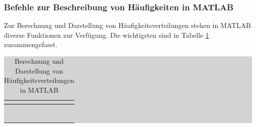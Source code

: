 \clearpage

\subsubsection{Befehle zur Beschreibung von H\"{a}ufigkeiten in MATLAB}

\noindent Zur Berechnung und Darstellung von H\"{a}ufigkeitsverteilungen stehen in MATLAB diverse Funktionen zur Verf\"{u}gung. Die wichtigsten sind in Tabelle \ref{tab:threefive} zusammengefasst.

\begin{table}[H]
\setlength{\arrayrulewidth}{.1em}
\caption{Berechnung und Darstellung von H\"{a}ufigkeitsverteilungen in MATLAB}
\setlength{\fboxsep}{0pt}%
\colorbox{lightgray}{%
%
\begin{tabular}{| c | c |}
\hline
\parbox[c][0.3in][c]{3.3in}{\smallskip\centering\textbf{\selectfont{MATLAB Befehl}}} & 
\parbox[c][0.3in][c]{3.3in}{\smallskip\centering\textbf{\selectfont{Funktionsbeschreibung}}}\\ \hline

\parbox[c][0.3in][c]{3.3in}{\centering{}\selectfont{sort(x)}} & 
\parbox[c][0.3in][c]{3.3in}{\centering{}}\\ \hline

\parbox[c][0.3in][c]{3.3in}{\centering{}\selectfont{cumsum(x)}} & 
\parbox[c][0.3in][c]{3.3in}{\centering{}\selectfont{Berechnet die kumulative Summe des Vektors x}}\\ \hline

\parbox[c][0.5in][c]{3.3in}{\centering{}\selectfont{hist(x)}} & 
\parbox[c][0.5in][c]{3.3in}{\centering{}}\\ \hline

\parbox[c][0.3in][c]{3.3in}{\centering{}\selectfont{tabulate(x)}} & 
\parbox[c][0.3in][c]{3.3in}{\centering{}}\\ \hline

\parbox[c][0.5in][c]{3.3in}{\centering{}\selectfont{bar(x)}} & 
\parbox[c][0.5in][c]{3.3in}{\centering{}\selectfont{Erzeugt ein Balkendiagramm ausx mit vertikaler Ausrichtung}}\\ \hline

\parbox[c][0.5in][c]{3.3in}{\centering{}\selectfont{barh(x)}} & 
\parbox[c][0.5in][c]{3.3in}{\centering{}\selectfont{Erzeugt ein Balkendiagramm ausX mit horizontaler Ausrichtung}}\\ \hline

\parbox[c][0.3in][c]{3.3in}{\centering{}\selectfont{pie(x)}} & 
\parbox[c][0.3in][c]{3.3in}{\centering{}\selectfont{Erzeugt ein Kreisdiagramm aus x}}\\ \hline

\end{tabular}%
}
\label{tab:threefive}
\end{table}

